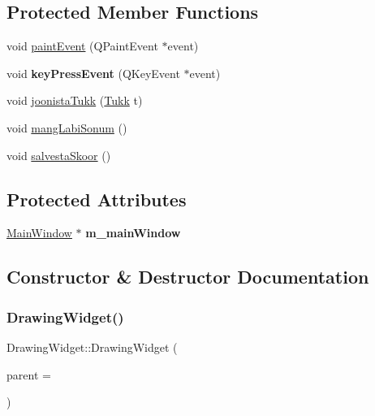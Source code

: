 \subsection*{Protected Member Functions}
\begin{DoxyCompactItemize}
\item 
void \mbox{\hyperlink{class_drawing_widget_acfae26f9320f7b4f0c425709514d2b5b}{paint\+Event}} (Q\+Paint\+Event $\ast$event)
\item 
\mbox{\label{class_drawing_widget_a1c8c4e61a95946ac0c847745a2c4fa1b}} 
void {\bfseries key\+Press\+Event} (Q\+Key\+Event $\ast$event)
\item 
void \mbox{\hyperlink{class_drawing_widget_ae6574fd0fa1a0a5b89ad5e960dcebb3a}{joonista\+Tukk}} (\mbox{\hyperlink{class_tukk}{Tukk}} t)
\item 
void \mbox{\hyperlink{class_drawing_widget_adf712171903e9b499388e7879f0630b3}{mang\+Labi\+Sonum}} ()
\item 
void \mbox{\hyperlink{class_drawing_widget_a67029aecb77034dbe211b953ce053606}{salvesta\+Skoor}} ()
\end{DoxyCompactItemize}
\subsection*{Protected Attributes}
\begin{DoxyCompactItemize}
\item 
\mbox{\label{class_drawing_widget_a2d19fc281bb398234a9a7392e98649fa}} 
\mbox{\hyperlink{class_main_window}{Main\+Window}} $\ast$ {\bfseries m\+\_\+main\+Window}
\end{DoxyCompactItemize}


\subsection{Constructor \& Destructor Documentation}
\mbox{\label{class_drawing_widget_a023e273550ee1a82ddb40468c36460d9}} 
\subsubsection{\texorpdfstring{DrawingWidget()}{DrawingWidget()}}
{\footnotesize\ttfamily Drawing\+Widget\+::\+Drawing\+Widget (\begin{DoxyParamCaption}\item[{\mbox{\hyperlink{class_main_window}{Main\+Window}} $\ast$}]{parent = {} }\end{DoxyParamCaption})}

